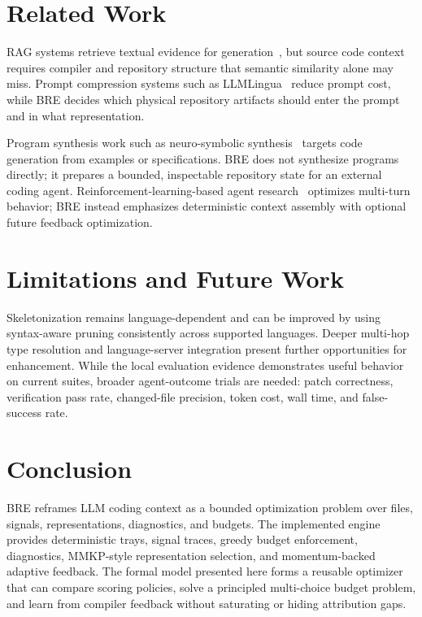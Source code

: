 \documentclass[11pt,onecolumn]{article}
\begin{document}
\section{Related Work}
RAG systems retrieve textual evidence for generation~\cite{lewis2020retrieval}, but source code context requires compiler and repository structure that semantic similarity alone may miss. Prompt compression systems such as LLMLingua~\cite{jiang2023llmlingua} reduce prompt cost, while BRE decides which physical repository artifacts should enter the prompt and in what representation.

Program synthesis work such as neuro-symbolic synthesis~\cite{parisotto2017neuro} targets code generation from examples or specifications. BRE does not synthesize programs directly; it prepares a bounded, inspectable repository state for an external coding agent. Reinforcement-learning-based agent research~\cite{wei2025webagent} optimizes multi-turn behavior; BRE instead emphasizes deterministic context assembly with optional future feedback optimization.

\section{Limitations and Future Work}
Skeletonization remains language-dependent and can be improved by using syntax-aware pruning consistently across supported languages. Deeper multi-hop type resolution and language-server integration present further opportunities for enhancement. While the local evaluation evidence demonstrates useful behavior on current suites, broader agent-outcome trials are needed: patch correctness, verification pass rate, changed-file precision, token cost, wall time, and false-success rate.

\section{Conclusion}
BRE reframes LLM coding context as a bounded optimization problem over files, signals, representations, diagnostics, and budgets. The implemented engine provides deterministic trays, signal traces, greedy budget enforcement, diagnostics, MMKP-style representation selection, and momentum-backed adaptive feedback. The formal model presented here forms a reusable optimizer that can compare scoring policies, solve a principled multi-choice budget problem, and learn from compiler feedback without saturating or hiding attribution gaps.



\end{document}
